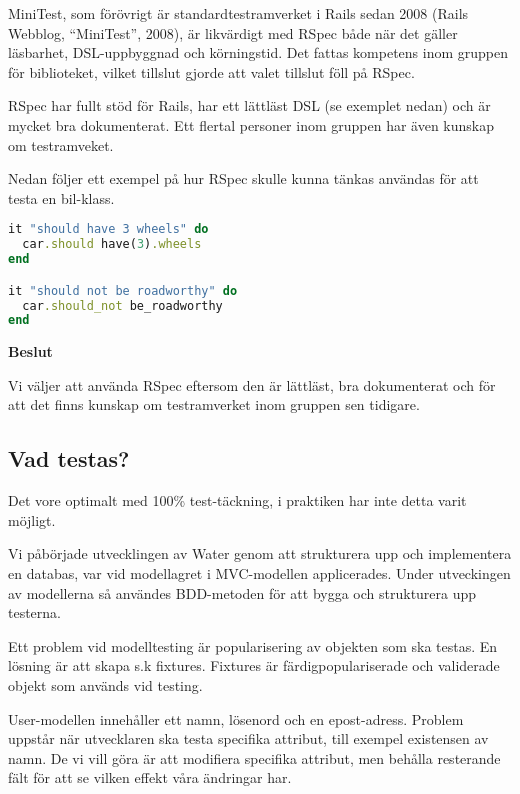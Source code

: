 MiniTest, som förövrigt är standardtestramverket i Rails sedan 2008 (Rails Webblog, “MiniTest”, 2008), är likvärdigt med RSpec både när det gäller läsbarhet, DSL-uppbyggnad och körningstid. Det fattas kompetens inom gruppen för biblioteket, vilket tillslut gjorde att valet tillslut föll på RSpec.

RSpec har fullt stöd för Rails, har ett lättläst DSL (se exemplet nedan) och är mycket bra dokumenterat. Ett flertal personer inom gruppen har även kunskap om testramveket.

Nedan följer ett exempel på hur RSpec skulle kunna tänkas användas för att testa en bil-klass.

\begin{lstlisting}[language=Ruby, showstringspaces=false]
it "should have 3 wheels" do
  car.should have(3).wheels
end

it "should not be roadworthy" do
  car.should_not be_roadworthy
end
\end{lstlisting}


\begin{flushright}
  
  \textbf{Beslut}

  Vi väljer att använda RSpec eftersom den är lättläst, bra dokumenterat och för att det finns kunskap om testramverket inom gruppen sen tidigare.
\end{flushright}

\subsection{Vad testas?}
Det vore optimalt med 100\% test-täckning, i praktiken har inte detta varit möjligt.

Vi påbörjade utvecklingen av Water genom att strukturera upp och implementera en databas, var vid modellagret i MVC-modellen applicerades. Under utveckingen av modellerna så användes BDD-metoden för att bygga och strukturera upp testerna. 

Ett problem vid modelltesting är popularisering av objekten som ska testas. En lösning är att skapa s.k fixtures. Fixtures är färdigpopulariserade och validerade objekt som används vid testing.

User-modellen innehåller ett namn, lösenord och en epost-adress. Problem uppstår när utvecklaren ska testa specifika attribut, till exempel existensen av namn. De vi vill göra är att modifiera specifika attribut, men behålla resterande fält för att se vilken effekt våra ändringar har.

